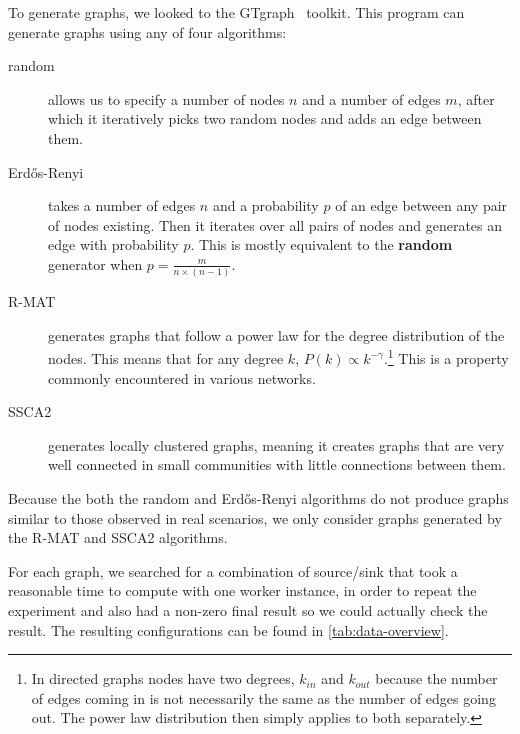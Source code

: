 To generate graphs, we looked to the GTgraph~\cite{bader2006gtgraph} toolkit. This program can generate graphs using any of four algorithms:
\begin{description}
    \item[random] allows us to specify a number of nodes $n$ and a number of edges $m$, after which it iteratively picks two random nodes and adds an edge between them.

    \item[Erd\H{o}s-Renyi] takes a number of edges $n$ and a probability $p$ of an edge between any pair of nodes existing. Then it iterates over all pairs of nodes and generates an edge with probability $p$. This is mostly equivalent to the \textbf{random} generator when $p = \frac{m}{n \times (n - 1)}$.

    \item[R-MAT] generates graphs that follow a power law for the degree distribution of the nodes. This means that for any degree $k$, $P(k) \propto k^{-\gamma}$.\footnote{In directed graphs nodes have two degrees, $k_{in}$ and $k_{out}$ because the number of edges coming in is not necessarily the same as the number of edges going out. The power law distribution then simply applies to both separately.} This is a property commonly encountered in various networks. \cite{newman2005power}
    
    \item[SSCA2] generates locally clustered graphs, meaning it creates graphs that are very well connected in small communities with little connections between them.
\end{description}

Because the both the random and Erd\H{o}s-Renyi algorithms do not produce graphs similar to those observed in real scenarios, we only consider graphs generated by the R-MAT and SSCA2 algorithms.

For each graph, we searched for a combination of source/sink that took a reasonable time to compute with one worker instance, in order to repeat the experiment and also had a non-zero final result so we could actually check the result. The resulting configurations can be found in \autoref{tab:data-overview}.

